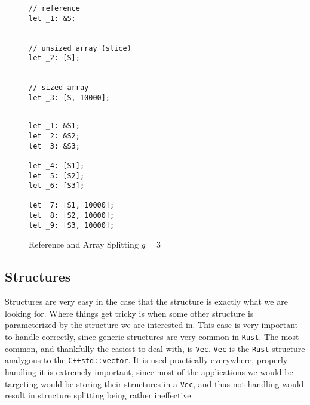 \documentclass[12pt,oneside]{book}
\newcommand{\rustname}{{\texttt{Rust}}}
\def \rust {\rustname{}\xspace}
\newcommand{\cppname}{{\texttt{C++}}}
\def \cpp {\cppname{}\xspace}
\newcommand{\vecname}{{\texttt{Vec}}}
\def \vec{\vecname{}\xspace}
\begin{document}
\begin{figure*}
  \begin{minipage}[t]{0.5\linewidth}
\begin{verbatim}
// reference
let _1: &S;


// unsized array (slice)
let _2: [S];


// sized array
let _3: [S, 10000];

\end{verbatim}
  \end{minipage}
  \begin{minipage}[t]{0.5\linewidth}
\begin{verbatim}

let _1: &S1;
let _2: &S2;
let _3: &S3;

let _4: [S1];
let _5: [S2];
let _6: [S3];

let _7: [S1, 10000];
let _8: [S2, 10000];
let _9: [S3, 10000];
\end{verbatim}
  \end{minipage}
  
  \caption{Reference and Array Splitting $g = 3$}
  \label{fig:refedecl}
\end{figure*}




\subsection{Structures}
Structures are very easy in the case that the structure is exactly what we are
looking for. Where things get tricky is when some other structure is
parameterized by the structure we are interested in. This case is very important
to handle correctly, since generic structures are very common in \rust. The most common,
and thankfully the easiest to deal with, is \vec. \vec is the \rust structure analygous
to the \cpp \texttt{std::vector}. It is used practically everywhere, properly handling it
is extremely important, since most of the applications we would be targeting would be storing
their structures in a \vec, and thus not handling would result in structure splitting being
rather ineffective.
\end{document}
